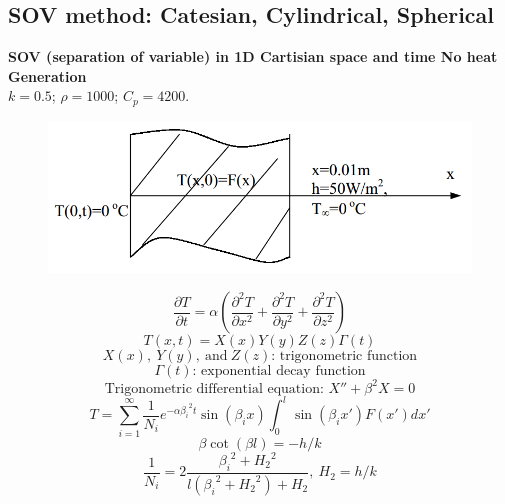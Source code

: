 \subsection{SOV method: Catesian, Cylindrical, Spherical}
\begin{example}
\textbf{ SOV (separation of variable) in 1D Cartisian space and time
No heat Generation}\\
$k = 0.5$; $\rho=1000$; $C_p = 4200$.
\begin{figure}[H]
  \centering
    \includegraphics[scale=0.5]{figures/appendixA/5}
\end{figure}

$$\frac{\partial T}{\partial t}=
\alpha\left(\frac{\partial^2 T}{\partial x^2}+
\frac{\partial^2 T}{\partial y^2}+
\frac{\partial^2 T}{\partial z^2}\right)$$
$$T(x,t)=X(x)Y(y)Z(z)\Gamma(t)$$
$$X(x),~Y(y),~\text{and} ~Z(z)\text{: trigonometric function}$$
$$\Gamma(t)\text{: exponential decay function}$$
$$\text{Trigonometric differential equation: }X''+\beta^2X=0$$
$$T=\sum_{i=1}^{\infty} \frac{1}{N_i}e^{-\alpha{\beta_i}^2t}\sin{(\beta_i x)}\int_0^{l}\sin{(\beta_i x')}F(x')dx'$$
$$\beta\cot{(\beta l)}=-h/k$$
$$\frac{1}{N_i}=2\frac{{\beta_i}^2+{H_2}^2}{l({\beta_i}^2+{H_2}^2)+H_2},
~H_2=h/k$$
\end{example}
